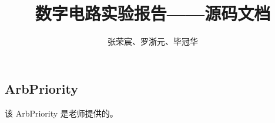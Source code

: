 \documentclass[a4paper]{article}
\begin{document}
\title{数字电路实验报告——源码文档}
\author{张荣宸、罗浙元、毕冠华}
\date{}

\maketitle


\subsection*{ArbPriority}

该 ArbPriority 是老师提供的。

\end{document}
